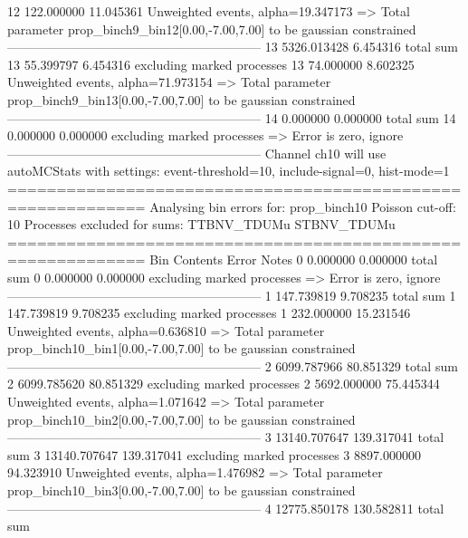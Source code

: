 12         122.000000      11.045361       Unweighted events, alpha=19.347173
  => Total parameter prop_binch9_bin12[0.00,-7.00,7.00] to be gaussian constrained
------------------------------------------------------------
13         5326.013428     6.454316        total sum                     
13         55.399797       6.454316        excluding marked processes    
13         74.000000       8.602325        Unweighted events, alpha=71.973154
  => Total parameter prop_binch9_bin13[0.00,-7.00,7.00] to be gaussian constrained
------------------------------------------------------------
14         0.000000        0.000000        total sum                     
14         0.000000        0.000000        excluding marked processes    
  => Error is zero, ignore      
------------------------------------------------------------
Channel ch10 will use autoMCStats with settings: event-threshold=10, include-signal=0, hist-mode=1
============================================================
Analysing bin errors for: prop_binch10
Poisson cut-off: 10
Processes excluded for sums: TTBNV_TDUMu STBNV_TDUMu
============================================================
Bin        Contents        Error           Notes                         
0          0.000000        0.000000        total sum                     
0          0.000000        0.000000        excluding marked processes    
  => Error is zero, ignore      
------------------------------------------------------------
1          147.739819      9.708235        total sum                     
1          147.739819      9.708235        excluding marked processes    
1          232.000000      15.231546       Unweighted events, alpha=0.636810
  => Total parameter prop_binch10_bin1[0.00,-7.00,7.00] to be gaussian constrained
------------------------------------------------------------
2          6099.787966     80.851329       total sum                     
2          6099.785620     80.851329       excluding marked processes    
2          5692.000000     75.445344       Unweighted events, alpha=1.071642
  => Total parameter prop_binch10_bin2[0.00,-7.00,7.00] to be gaussian constrained
------------------------------------------------------------
3          13140.707647    139.317041      total sum                     
3          13140.707647    139.317041      excluding marked processes    
3          8897.000000     94.323910       Unweighted events, alpha=1.476982
  => Total parameter prop_binch10_bin3[0.00,-7.00,7.00] to be gaussian constrained
------------------------------------------------------------
4          12775.850178    130.582811      total sum                     
